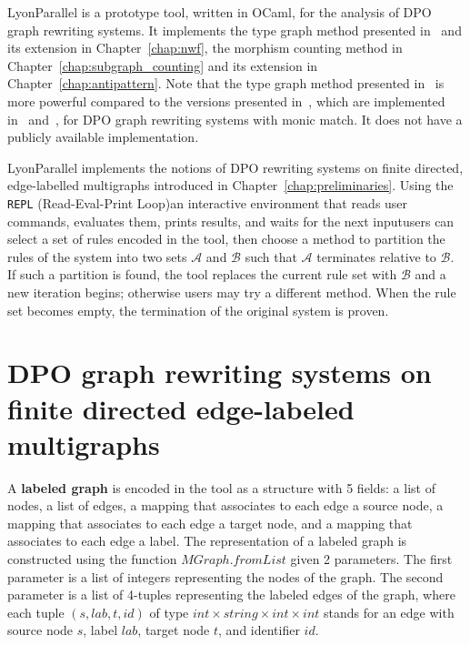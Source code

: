 LyonParallel is a prototype tool, written in OCaml, for the analysis of DPO graph rewriting systems.
It implements the type graph method presented in~\cite{endrullis2024generalized_icgt} and its extension in Chapter~\ref{chap:nwf}, the morphism counting method in Chapter~\ref{chap:subgraph_counting} and its extension in Chapter~\ref{chap:antipattern}. Note that the type graph method presented in~\cite{endrullis2024generalized_icgt} is more powerful compared to the versions presented in~\cite{zantema2014termination,bruggink2014termination,bruggink2015proving}, which are implemented in~\cite{TORPAcyc} and~\cite{grez}, for DPO graph rewriting systems with monic match. It does not have a publicly available implementation. 

LyonParallel implements the notions of DPO rewriting systems on finite directed, edge-labelled multigraphs introduced in Chapter~\ref{chap:preliminaries}. Using the \texttt{REPL} (Read-Eval-Print Loop)\textemdash an interactive environment that reads user commands, evaluates them, prints results, and waits for the next input\textemdash users can select a set of rules encoded in the tool, then choose a method to partition the rules of the system into two sets $\mathcal{A}$ and $\mathcal{B}$ such that $\mathcal{A}$ terminates relative to $\mathcal{B}$. If such a partition is found, the tool replaces the current rule set with \(\mathcal{B}\) and a new iteration begins; otherwise users may try a different method. When the rule set becomes empty, the termination of the original system is proven.
\section{DPO graph rewriting systems on finite directed edge-labeled multigraphs}
\label{lyonparallel:sec:implementation_of_dpo_graph_rewriting_systems}
A \textbf{labeled graph} is encoded in the tool as a structure with 5 fields: a list of nodes, a list of edges, a mapping that associates to each edge a source node, a mapping that associates to each edge a target node, and a mapping that associates to each edge a label.
The representation of a labeled graph is constructed using the function \colorbox{Ivory2}{$MGraph.fromList$} given 2 parameters. The first parameter is a list of integers representing the nodes of the graph. The second parameter is a list of 4-tuples representing the labeled edges of the graph, where each tuple \colorbox{Ivory2}{$(s,lab,t,id)$} of type \colorbox{Ivory2}{$\textit{int}\times \textit{string}\times \textit{int}\times \textit{int}$} stands for an edge with source node $s$, label $lab$, target node $t$, and identifier $id$.

